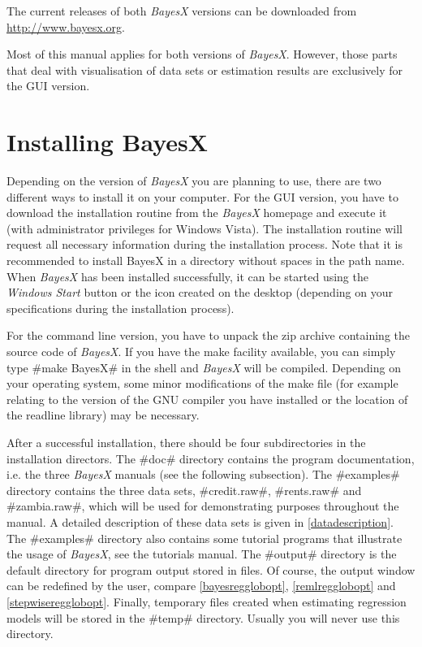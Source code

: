 The current releases of both {\em BayesX} versions can be downloaded from \href{http://www.bayesx.org}
{http://www.bayesx.org}.

Most of this manual applies for both versions of {\it BayesX}. However, those parts that deal with visualisation of data sets
or estimation results are exclusively for the GUI version.

\section{Installing BayesX}\label{installbayesx}
 

Depending on the version of {\it BayesX} you are planning to use, there are two different ways to install it on your computer.
For the GUI version, you have to download the installation routine from the {\em BayesX} homepage and execute it (with
administrator privileges for Windows Vista). The installation routine will request all necessary information during the
installation process. Note that it is recommended to install BayesX in a directory without spaces in the path name. When {\em
BayesX} has been installed successfully, it can be started using the {\em Windows Start} button or the icon created on the
desktop (depending on your specifications during the installation process).

For the command line version, you have to unpack the zip archive containing the source code of {\it BayesX}. If you have the
make facility available, you can simply type #make BayesX# in the shell and {\it BayesX} will be compiled. Depending on your
operating system, some minor modifications of the make file (for example relating to the version of the GNU compiler you have
installed or the location of the readline library) may be necessary.

After a successful installation, there should be four subdirectories in the installation directors. The #doc# directory
contains the program documentation, i.e. the three {\em BayesX} manuals (see the following subsection). The #examples#
directory contains the three data sets, #credit.raw#, #rents.raw# and #zambia.raw#, which will be used for demonstrating
purposes throughout the manual. A detailed description of these data sets is given in \autoref{datadescription}. The #examples#
directory also contains some tutorial programs that illustrate the usage of {\em BayesX}, see the tutorials manual. The
#output# directory is the default directory for program output stored in files. Of course, the output window can be redefined
by the user, compare \autoref{bayesregglobopt}, \autoref{remlregglobopt} and \autoref{stepwiseregglobopt}. Finally, temporary
files created when estimating regression models will be stored in the #temp# directory. Usually you will never use this
directory.

